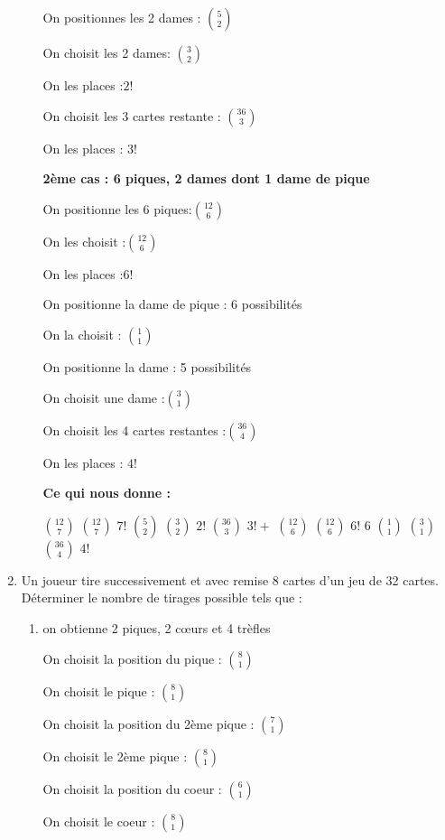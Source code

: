 \documentclass[a4paper,10pt]{article}
\begin{document}
\begin{enumerate}
\begin{enumerate}
		On positionnes les 2 dames : 
		$\binom{5}{2}$
		
		On choisit les 2 dames:
		$\binom{3}{2}$
		
		On les places :$2!$
		
		On choisit les 3 cartes restante :
		$\binom{36}{3}$
		
		On les places : $3!$
		
		
		\textbf{2ème cas : 6 piques, 2 dames dont 1 dame de pique}
		
		On positionne les 6 piques:$\binom{12}{6}$
		
		On les choisit :$\binom{12}{6}$
		
		On les places :$6!$
		
		On positionne la dame de pique : 6 possibilités
		
		On la choisit : $\binom{1}{1}$
		
		On positionne la dame : 5 possibilités
		
		On choisit une dame :$\binom{3}{1}$
				
		On choisit les 4 cartes restantes :$\binom{36}{4}$		
		
		On les places : $4!$	
		
		
		\textbf{Ce qui nous donne :}
		
		$\binom{12}{7}$
		$\binom{12}{7}$
		$7!$
		$\binom{5}{2}$
		$\binom{3}{2}$
		$2!$
		$\binom{36}{3}$
		$3!+$
		$\binom{12}{6}$
		$\binom{12}{6}$
		$6!$
		$6$
		$\binom{1}{1}$
		$\binom{3}{1}$
		$\binom{36}{4}$		
		$4!$	
		
		
		\end{enumerate}
	
	\item Un joueur tire successivement et avec remise 8 cartes d'un jeu de 32 cartes. Déterminer le nombre de tirages possible tels que :
		\begin{enumerate}
		\item on obtienne 2 piques, 2 cœurs et 4 trèfles

		
		On choisit la position du pique :
		$\binom{8}{1}$
		
		On choisit le pique :
		$\binom{8}{1}$
		
		On choisit la position du 2ème pique :
		$\binom{7}{1}$
		
		On choisit le 2ème pique :
		$\binom{8}{1}$
		
		On choisit la position du coeur :
		$\binom{6}{1}$
		
		On choisit le coeur :
		$\binom{8}{1}$
		

\end{enumerate}
\end{enumerate}
\end{document}
